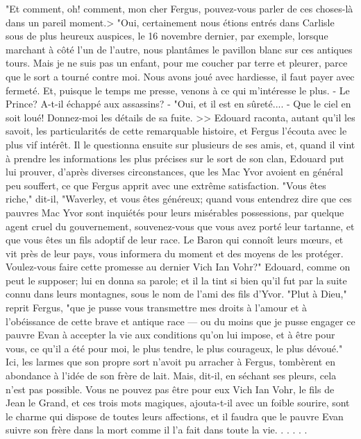 {"Et comment, oh! comment, mon cher Fergus, pouvez-vous parler de ces choses-là dans un pareil moment.>
"Oui, certainement nous étions entrés dans Carlisle sous de plus heureux auspices, le 16 novembre dernier, par exemple, lorsque marchant à côté l'un de l'autre, nous plantâmes le pavillon blanc sur ces antiques tours. Mais je ne suis pas un enfant, pour me coucher par terre et pleurer, parce que le sort a tourné contre moi. Nous avons joué avec hardiesse, il faut payer avec fermeté. Et, puisque le temps me presse, venons à ce qui m'intéresse le plus. - Le Prince? A-t-il échappé aux assassins?
- "Oui, et il est en sûreté....
- Que le ciel en soit loué! Donnez-moi les détails de sa fuite. >>\setcounter{page}{385} Edouard raconta, autant qu'il les savoit, les particularités de cette remarquable histoire, et Fergus l'écouta avec le plus vif intérêt. Il le questionna ensuite sur plusieurs de ses amis, et, quand il vint à prendre les informations les plus précises sur le sort de son clan, Edouard put lui prouver, d'après diverses circonstances, que les Mac Yvor avoient en général peu souffert, ce que Fergus apprit avec une extrême satisfaction. "Vous êtes riche," dit-il, "Waverley, et vous êtes généreux; quand vous entendrez dire que ces pauvres Mac Yvor sont inquiétés pour leurs misérables possessions, par quelque agent cruel du gouvernement, souvenez-vous que vous avez porté leur tartanne, et que vous êtes un fils adoptif de leur race. Le Baron qui connoît leurs mœurs, et vit près de leur pays, vous informera du moment et des moyens de les protéger. Voulez-vous faire cette promesse au dernier Vich Ian Vohr?"
Edouard, comme on peut le supposer; lui en donna sa parole; et il la tint si bien qu'il fut par la suite connu dans leurs montagnes, sous le nom de l'ami des fils d'Yvor. "Plut à Dieu," reprit Fergus, "que je pusse vous transmettre mes droits à l'amour\setcounter{page}{386} et à l'obéissance de cette brave et antique race — ou du moins que je pusse engager ce pauvre Evan à accepter la vie aux conditions qu'on lui impose, et à être pour vous, ce qu'il a été pour moi, le plus tendre, le plus courageux, le plus dévoué." Ici, les larmes que son propre sort n'avoit pu arracher à Fergus, tombèrent en abondance à l'idée de son frère de lait.
Mais, dit-il, en séchant ses pleurs, cela n'est pas possible. Vous ne pouvez pas être pour eux Vich Ian Vohr, le fils de Jean le Grand, et ces trois mots magiques, ajouta-t-il avec un foible sourire, sont le charme qui dispose de toutes leurs affections, et il faudra que le pauvre Evan suivre son frère dans la mort comme il l'a fait dans toute la vie. . . . . .
}
